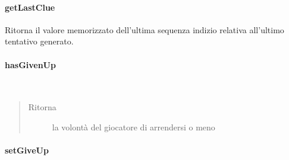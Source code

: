 \documentclass[letterpaper,10pt,italian,openany,oneside]{sphinxmanual}
\begin{document}
\paragraph{getLastClue}
\label{\detokenize{source/it/unicam/cs/pa/mastermind/players/CodeBreaker:getlastclue}}

\begin{fulllineitems}
\label{\detokenize{source/it/unicam/cs/pa/mastermind/players/CodeBreaker:it.unicam.cs.pa.mastermind.players.CodeBreaker.getLastClue()}}
Ritorna il valore memorizzato dell’ultima sequenza indizio relativa all’ultimo tentativo generato.

\end{fulllineitems}



\paragraph{hasGivenUp}
\label{\detokenize{source/it/unicam/cs/pa/mastermind/players/CodeBreaker:hasgivenup}}

\begin{fulllineitems}
\label{\detokenize{source/it/unicam/cs/pa/mastermind/players/CodeBreaker:it.unicam.cs.pa.mastermind.players.CodeBreaker.hasGivenUp()}}~\begin{quote}\begin{description}
\item[{Ritorna}] \leavevmode
la volontà del giocatore  di arrendersi o meno

\end{description}\end{quote}

\end{fulllineitems}



\paragraph{setGiveUp}
\label{\detokenize{source/it/unicam/cs/pa/mastermind/players/CodeBreaker:setgiveup}}
\end{document}
